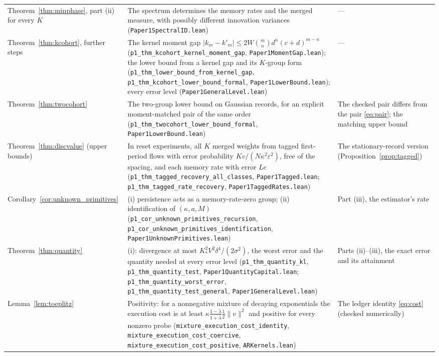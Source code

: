 \documentclass[12pt]{article}
\theoremstyle{definition}
\theoremstyle{remark}
\begin{document}
\begin{longtable}{>{\raggedright\arraybackslash}p{}>{\raggedright\arraybackslash}p{}>{\raggedright\arraybackslash}p{}}
Theorem~\ref{thm:minphase}, part (ii) for every $K$ & The spectrum determines the memory rates and the merged measure, with possibly different innovation variances (\nolinkurl{Paper1SpectralID.lean}) & ---\\
Theorem~\ref{thm:kcohort}, further steps & The kernel moment gap $|k_m-k'_m|\le2W\binom mn d^n(c+d)^{m-n}$ (\nolinkurl{p1_thm_kcohort_kernel_moment_gap}, \nolinkurl{Paper1MomentGap.lean}); the lower bound from a kernel gap and its $K$-group form (\nolinkurl{p1_thm_lower_bound_from_kernel_gap}, \nolinkurl{p1_thm_kcohort_lower_bound_formal}, \nolinkurl{Paper1LowerBound.lean}); every error level (\nolinkurl{Paper1GeneralLevel.lean}) & ---\\
Theorem~\ref{thm:twocohort} & The two-group lower bound on Gaussian records, for an explicit moment-matched pair of the same order (\nolinkurl{p1_thm_twocohort_lower_bound_formal}, \nolinkurl{Paper1LowerBound.lean}) & The checked pair differs from the pair \eqref{eq:pair}; the matching upper bound\\
Theorem~\ref{thm:discvalue} (upper bounds) & In reset experiments, all $K$ merged weights from tagged first-period flows with error probability $Kv/(N\kappa^2\varepsilon^2)$, free of the spacing, and each memory rate with error $Le$ (\nolinkurl{p1_thm_tagged_recovery_all_classes}, \nolinkurl{Paper1Tagged.lean}; \nolinkurl{p1_thm_tagged_rate_recovery}, \nolinkurl{Paper1TaggedRates.lean}) & The stationary-record version (Proposition~\ref{prop:tagged})\\
Corollary~\ref{cor:unknown_primitives} & (i) persistence acts as a memory-rate-zero group; (ii) identification of $(\kappa,a,M)$ (\nolinkurl{p1_cor_unknown_primitives_recursion}, \nolinkurl{p1_cor_unknown_primitives_identification}, \nolinkurl{Paper1UnknownPrimitives.lean}) & Part (iii), the estimator's rate\\
Theorem~\ref{thm:quantity} & (i): divergence at most $K_*^2V^2\delta^4/(2\sigma^2)$, the worst error and the quantity needed at every error level (\texttt{p1\_thm\_quantity\_kl}, \texttt{p1\_thm\_quantity\_test}, \nolinkurl{Paper1QuantityCapital.lean}; \nolinkurl{p1_thm_quantity_worst_error}, \nolinkurl{p1_thm_quantity_test_general}, \nolinkurl{Paper1GeneralLevel.lean}) & Parts (ii)--(iii), the exact error and its attainment\\
Lemma~\ref{lem:toeplitz} & Positivity: for a nonnegative mixture of decaying exponentials the execution cost is at least $\kappa\frac{1-\bar\lambda}{1+\bar\lambda}\frac12\|v\|^2$ and positive for every nonzero probe (\nolinkurl{mixture_execution_cost_identity}, \nolinkurl{mixture_execution_cost_coercive}, \nolinkurl{mixture_execution_cost_positive}, \nolinkurl{ARKernels.lean}) & The ledger identity \eqref{eq:cost} (checked numerically)\\

\end{longtable}
\end{document}

